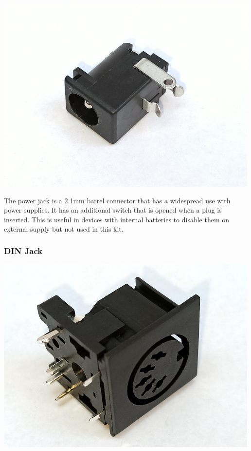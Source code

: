 \documentclass{scrartcl}
\begin{document}
\begin{center}
    \includegraphics[scale=0.5]{assets/zekit-dcjack-resized.jpg}
\end{center}

The power jack is a 2.1mm barrel connector that has a widespread use with power supplies. It has an additional switch that is opened when a plug is inserted. This is useful in devices with internal batteries to disable them on external supply but not used in this kit.

\subsubsection{DIN Jack}

\begin{center}
    \includegraphics[scale=0.5]{assets/zekit-din-resized.jpg}
\end{center}
\end{document}
